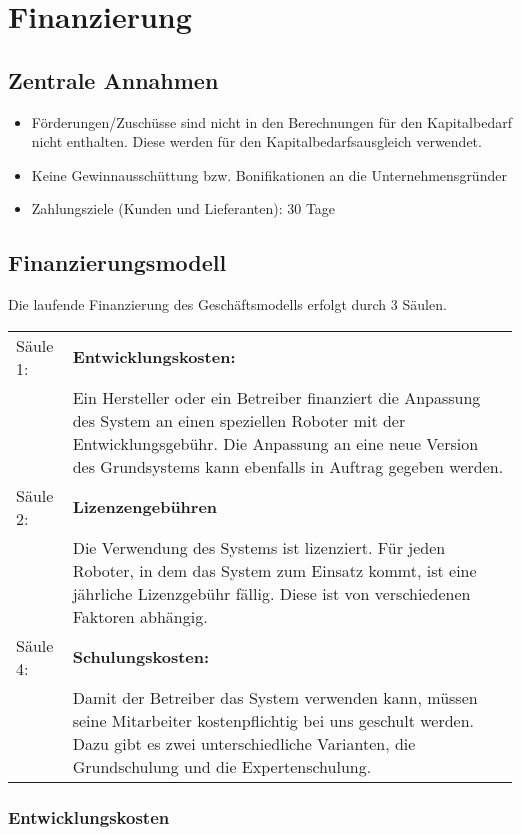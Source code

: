 \chapter{Finanzierung}
\section{Zentrale Annahmen}
\begin{itemize}
	\item Förderungen/Zuschüsse sind nicht in den Berechnungen für den Kapitalbedarf nicht enthalten. Diese werden \ggf für den Kapitalbedarfsausgleich verwendet.
	\item Keine Gewinnausschüttung bzw. Bonifikationen an die Unternehmensgründer
	\item Zahlungsziele (Kunden und Lieferanten): 30 Tage
\end{itemize}

\section{Finanzierungsmodell}
Die laufende Finanzierung des Geschäftsmodells erfolgt durch 3 Säulen. 

\noindent
\begin{tabular}{@{}>{\raggedright\arraybackslash}p{1.8cm}@{}>{\raggedright\arraybackslash}p{\textwidth - 1.8cm}}
 
	Säule 1: & \textbf{Entwicklungskosten:}\\
	& Ein Hersteller oder ein Betreiber finanziert die Anpassung des System an einen speziellen Roboter mit der Entwicklungsgebühr. Die Anpassung an eine neue Version des Grundsystems kann ebenfalls in Auftrag gegeben werden.\\ 

	Säule 2: & \textbf{Lizenzengebühren}\\
	& Die Verwendung des Systems ist lizenziert. Für jeden Roboter, in dem das System zum Einsatz kommt, ist eine jährliche Lizenzgebühr fällig. Diese ist von verschiedenen Faktoren abhängig. \\
	
	Säule 4: & \textbf{Schulungskosten:}\\
	& Damit der Betreiber das System verwenden kann, müssen seine Mitarbeiter kostenpflichtig bei uns geschult werden. Dazu gibt es zwei unterschiedliche Varianten, die Grundschulung und die Expertenschulung.
\end{tabular}

\subsection{Entwicklungskosten}
